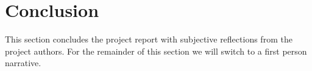 
\section{Conclusion}
\label{sec:conclusion}

This section concludes the project report with subjective reflections from the project authors. For the remainder of this section we will switch to a first person narrative.







